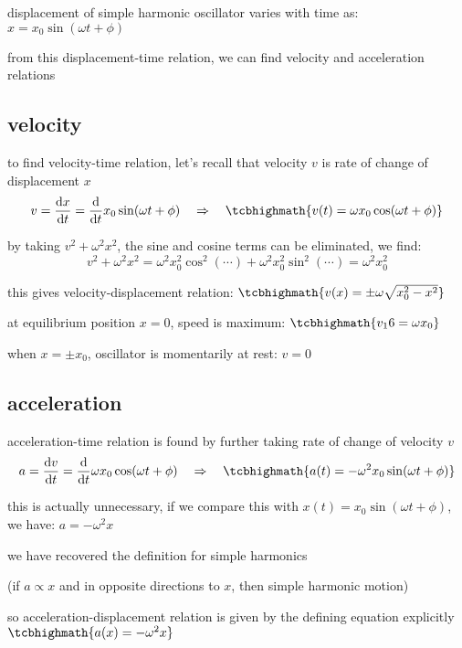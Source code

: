 displacement of simple harmonic oscillator varies with time as: $x=x_0\sin(\omega t + \phi)$

from this displacement-time relation, we can find velocity and acceleration relations

\subsection*{velocity}

to find velocity-time relation, let's recall that velocity $v$ is rate of change of displacement $x$
\begin{equation*}
	v = \frac{\dd x}{\dd t} = \frac{\dd}{\dd t} x_0\sin(\omega t+\phi) \RA \tcbhighmath{v(t) = \omega x_0 \cos(\omega t+\phi)}
\end{equation*}

by taking $v^2 + \omega^2 x^2$, the sine and cosine terms can be eliminated, we find:
\begin{equation*}
	v^2 + \omega^2 x^2 = \omega^2 x_0^2 \cos^2(\cdots) + \omega^2 x_0^2 \sin^2(\cdots) = \omega^2 x_0^2
\end{equation*}

this gives velocity-displacement relation: $\tcbhighmath{v(x)=\pm \omega\sqrt{x_0^2 - x^2}}$

\cmt at equilibrium position $x=0$, speed is maximum: $\tcbhighmath{v_\tmax = \omega x_0}$ 

\cmt when $x=\pm x_0$, oscillator is momentarily at rest: $v=0$ 

\subsection*{acceleration}

acceleration-time relation is found by further taking rate of change of velocity $v$
\begin{equation*}
a = \frac{\dd v}{\dd t} = \frac{\dd}{\dd t} \omega x_0 \cos(\omega t+\phi) \RA \tcbhighmath{a(t) = - \omega^2 x_0 \sin(\omega t+\phi)}
\end{equation*}

this is actually unnecessary, if we compare this with $x(t)=x_0 \sin(\omega t+\phi)$, we have: $a=-\omega^2 x$

we have recovered the definition for simple harmonics

(if $a \propto x$ and in opposite directions to $x$, then simple harmonic motion)

so acceleration-displacement relation is given by the defining equation explicitly $\tcbhighmath{a(x) = -\omega^2 x} $

